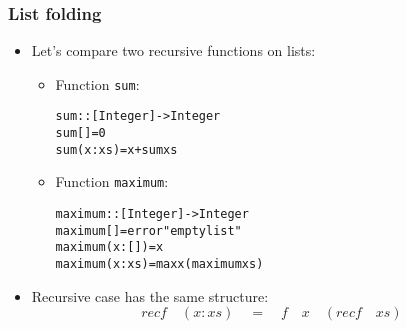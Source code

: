 \documentclass[final,handout]{beamer}
\begin{document}
\begin{frame}[fragile]
    \frametitle{List folding}

    \begin{itemize}
        \item Let's compare two recursive functions on lists:

        \begin{itemize}
            \item Function \texttt{sum}:
            \begin{alltt}
    sum :: [Integer] -> Integer
    sum []           = 0
    sum (x : xs)     = x + sum xs
            \end{alltt}

        \item Function \texttt{maximum}:
            \begin{alltt}
    maximum :: [Integer] -> Integer
    maximum []       = error "empty list"
    maximum (x : []) = x
    maximum (x : xs) = max x (maximum xs)
            \end{alltt}
        \end{itemize}

    \item<2-> {\color{red}Recursive case has the same structure:}
            $$
            recf \quad (x:xs) \quad = \quad f \quad x \quad (recf \quad xs)
            $$

    \end{itemize}
    ~
    \\~
\end{frame}
\end{document}
